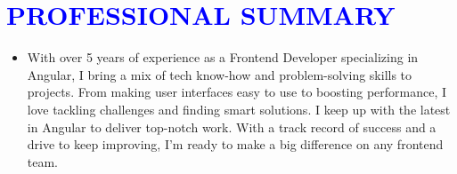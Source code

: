 \section{\texorpdfstring{\textcolor{blue}{PROFESSIONAL SUMMARY {\color{black}\hrulefill}}}{PROFESSIONAL SUMMARY}}
\begin{itemize}[label=, leftmargin=0pt]
  \item{ With over 5 years of experience as a Frontend Developer specializing in Angular, I bring a mix of tech know-how and problem-solving skills to projects. From making user interfaces easy to use to boosting performance, I love tackling challenges and finding smart solutions. I keep up with the latest in Angular to deliver top-notch work. With a track record of success and a drive to keep improving, I'm ready to make a big difference on any frontend team.}
\end{itemize}
